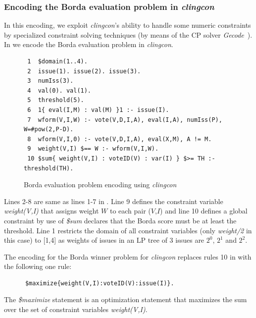 \subsubsection{Encoding the Borda evaluation problem in \emph{clingcon}}
In this encoding, we exploit \emph{clingcon}'s ability to handle some 
numeric constraints by specialized constraint solving techniques (by
means of the CP solver \emph{Gecode}~\cite{Schulte:gecode}). In 
 we encode the Borda evaluation problem 
in \emph{clingcon}.

\begin{figure}
  \begin{framed}
  \small
    \begin{verbatim}
 1  $domain(1..4).
 2  issue(1). issue(2). issue(3).
 3  numIss(3).
 4  val(0). val(1).
 5  threshold(5).
 6  1{ eval(I,M) : val(M) }1 :- issue(I).
 7  wform(V,I,W) :- vote(V,D,I,A), eval(I,A), numIss(P), W=#pow(2,P-D).
 8  wform(V,I,0) :- vote(V,D,I,A), eval(X,M), A != M.
 9  weight(V,I) $== W :- wform(V,I,W).
 10 $sum{ weight(V,I) : voteID(V) : var(I) } $>= TH :- threshold(TH).
    \end{verbatim}
  \end{framed}
  \caption{\small Borda evaluation problem encoding using \emph{clingcon}}
  \label{fig:clingcon:bordaEval}
\end{figure}
Lines 2-8 are same as lines 1-7 in .
Line 9 defines the constraint variable \textit{weight(V,I)} that assigns weight $W$ to
each pair ($V$,$I$)
and line 10 defines a global constraint by use of \textit{\$sum}
declares that the Borda score must be at least the threshold.
Line 1 restricts the domain of all constraint variables
(only \textit{weight/2} in this case) to {[}1,4{]} as weights of issues
in an LP tree of 3 issues are $2^0$, $2^1$ and $2^2$.

The encoding for the Borda winner problem for \emph{clingcon} 
replaces rules 10 in  with the following 
one rule:
  \begin{framed}
  \small
    \begin{verbatim}
      $maximize{weight(V,I):voteID(V):issue(I)}.
    \end{verbatim}
  \end{framed}
The \textit{\$maximize} statement is an optimization statement 
that maximizes the sum over the set of constraint variables \textit{weight(V,I)}.


